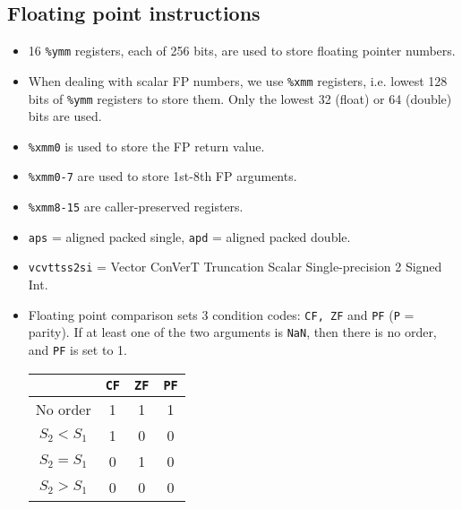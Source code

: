 \subsection{Floating point instructions}
\begin{itemize}
\item 16 \texttt{\%ymm} registers, each of 256 bits, are used to store floating pointer numbers.
\item When dealing with scalar FP numbers, we use \texttt{\%xmm} registers, i.e. lowest 128 bits of \texttt{\%ymm} registers to store them. Only the lowest 32 (float) or 64 (double) bits are used.
\item \texttt{\%xmm0} is used to store the FP return value.
\item \texttt{\%xmm0-7} are used to store 1st-8th FP arguments.
\item \texttt{\%xmm8-15} are caller-preserved registers.
\item \texttt{aps} = aligned packed single, \texttt{apd} = aligned packed double.
\item \texttt{vcvttss2si} = Vector ConVerT Truncation Scalar Single-precision 2 Signed Int.
\item Floating point comparison sets 3 condition codes: \texttt{CF, ZF} and \texttt{PF} (\texttt{P} = parity). If at least one of the two arguments is \texttt{NaN}, then there is no order, and \texttt{PF} is set to 1.
\begin{center}
\tablefirsthead{}
\tablelasttail{}
\begin{supertabular}{cccc}\toprule
&\texttt{CF}&\texttt{ZF}&\texttt{PF}\\\midrule
No order  & 1 & 1 & 1\\
$S_2<S_1$ & 1 & 0 & 0\\
$S_2=S_1$ & 0 & 1 & 0\\
$S_2>S_1$ & 0 & 0 & 0\\\bottomrule
\end{supertabular}
\end{center}
\end{itemize}
